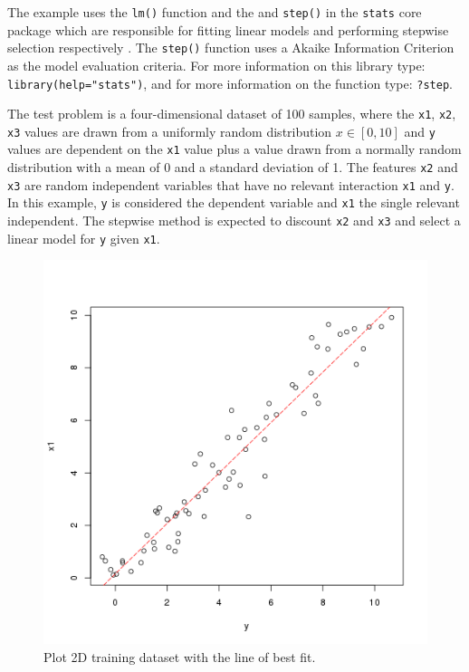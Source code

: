 The example uses the \texttt{lm()} function and the and \texttt{step()} in the \texttt{stats} core package which are responsible for fitting linear models and performing stepwise selection respectively \cite{RDCT2011a}. The \texttt{step()} function uses a Akaike Information Criterion as the model evaluation criteria. For more information on this library type: \texttt{library(help="stats")}, and for more information on the function type: \texttt{?step}.

The test problem is a four-dimensional dataset of 100 samples, where the \texttt{x1}, \texttt{x2}, \texttt{x3} values are drawn from a uniformly random distribution $x \in [0,10]$ and \texttt{y} values are dependent on the \texttt{x1} value plus a value drawn from a normally random distribution with a mean of 0 and a standard deviation of 1. The features \texttt{x2} and \texttt{x3} are random independent variables that have no relevant interaction \texttt{x1} and \texttt{y}. In this example, \texttt{y} is considered the dependent variable and \texttt{x1} the single relevant independent. The stepwise method is expected to discount \texttt{x2} and \texttt{x3} and select a linear model for \texttt{y} given \texttt{x1}.



\begin{figure}[htp]
\centering
\includegraphics[scale=0.45]{a_regression/stepwise_regression_result.png}
\caption{Plot 2D training dataset with the line of best fit.}
\label{plot:stepwise_regression_result}
\end{figure}


